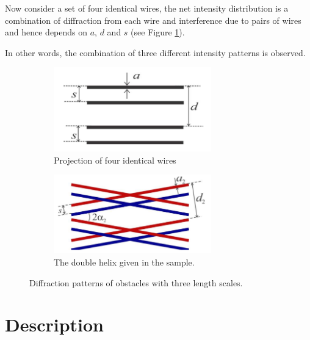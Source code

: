 Now consider a set of four identical wires, the net intensity distribution is a combination of diffraction from each wire and interference due to pairs of wires and hence depends on $a$, $d$ and $s$ (see Figure \ref{fig:fourwires}).

In other words, the combination of three different intensity patterns is observed.

\begin{figure}[!htb]
    \centering
    \begin{subfigure}[b]{0.45\textwidth}
                \centering
                \includegraphics[width=0.75\textwidth]{figs/fourwires.png}
                \caption{Projection of four identical wires}
                \label{fig:fourwires}
        \end{subfigure}%
        \begin{subfigure}[b]{0.45\textwidth}
                \centering
                \includegraphics[width=0.75\textwidth]{figs/doublehelix-schema.png}
                \caption{The double helix given in the sample.}
                \label{fig:doublehelix2}
        \end{subfigure}
        \caption{Diffraction patterns of obstacles with three length scales.}
\end{figure}

\section*{Description}

